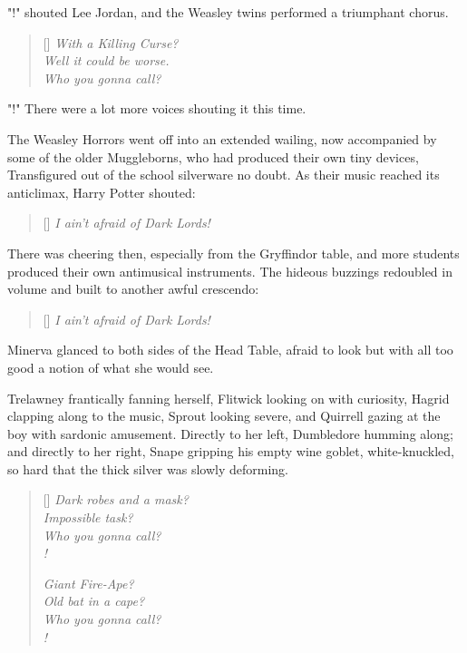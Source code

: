 "!" shouted Lee Jordan, and the Weasley twins performed a 
triumphant chorus.

\baselineskip\settowidth{\versewidth}{I ain't afraid of Dark Lords!}
\begin{verse}[\versewidth]
\emph{With a Killing Curse?\\
Well it could be worse.\\
Who you gonna call?}
\end{verse}\baselineskip

"!" There were a lot more voices shouting it this time.

The Weasley Horrors went off into an extended wailing, now accompanied by some 
of the older Muggleborns, who had produced their own tiny devices, Transfigured 
out of the school silverware no doubt. As their music reached its anticlimax, 
Harry Potter shouted:

\baselineskip\settowidth{\versewidth}{I ain't afraid of Dark Lords!}
\begin{verse}[\versewidth]
\emph{I ain't afraid of Dark Lords!}
\end{verse}\baselineskip

There was cheering then, especially from the Gryffindor table, and more 
students produced their own antimusical instruments. The hideous buzzings 
redoubled in volume and built to another awful crescendo:

\baselineskip\settowidth{\versewidth}{I ain't afraid of Dark Lords!}
\begin{verse}[\versewidth]
\emph{I ain't afraid of Dark Lords!}
\end{verse}\baselineskip

Minerva glanced to both sides of the Head Table, afraid to look but with all 
too good a notion of what she would see.

Trelawney frantically fanning herself, Flitwick looking on with curiosity, 
Hagrid clapping along to the music, Sprout looking severe, and Quirrell gazing 
at the boy with sardonic amusement. Directly to her left, Dumbledore humming 
along; and directly to her right, Snape gripping his empty wine goblet, 
white-knuckled, so hard that the thick silver was slowly deforming.


\baselineskip\settowidth{\versewidth}{I ain't afraid of Dark Lords!}
\begin{verse}[\versewidth]
\emph{Dark robes and a mask?\\
Impossible task?\\
Who you gonna call?\\
!}

\emph{Giant Fire-Ape?\\
Old bat in a cape?\\
Who you gonna call?\\
!}
\end{verse}\baselineskip

